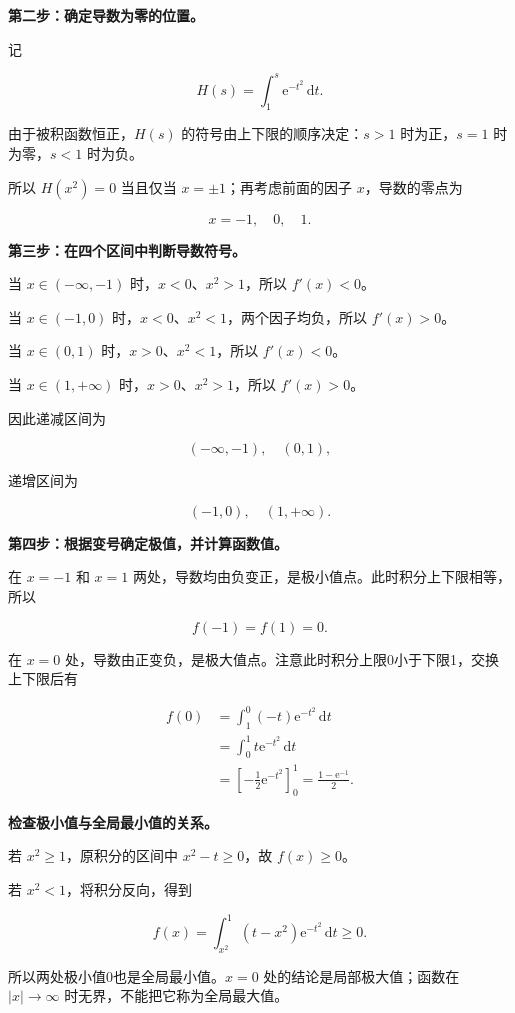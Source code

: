 \documentclass[UTF8,11pt,fontset=windows]{ctexart}
\begin{document}
\textbf{第二步：确定导数为零的位置。}

记

$$
H(s)=\int_1^s\mathrm e^{-t^2}\,\mathrm dt.
$$

由于被积函数恒正，$H(s)$ 的符号由上下限的顺序决定：$s>1$ 时为正，$s=1$ 时为零，$s<1$ 时为负。

所以 $H(x^2)=0$ 当且仅当 $x=\pm1$；再考虑前面的因子 $x$，导数的零点为

$$
x=-1,\quad0,\quad1.
$$

\textbf{第三步：在四个区间中判断导数符号。}

当 $x\in(-\infty,-1)$ 时，$x<0$、$x^2>1$，所以 $f'(x)<0$。

当 $x\in(-1,0)$ 时，$x<0$、$x^2<1$，两个因子均负，所以 $f'(x)>0$。

当 $x\in(0,1)$ 时，$x>0$、$x^2<1$，所以 $f'(x)<0$。

当 $x\in(1,+\infty)$ 时，$x>0$、$x^2>1$，所以 $f'(x)>0$。

因此递减区间为

$$
\boxed{(-\infty,-1),\quad(0,1)},
$$

递增区间为

$$
\boxed{(-1,0),\quad(1,+\infty)}.
$$

\textbf{第四步：根据变号确定极值，并计算函数值。}

在 $x=-1$ 和 $x=1$ 两处，导数均由负变正，是极小值点。此时积分上下限相等，所以

$$
\boxed{f(-1)=f(1)=0}.
$$

在 $x=0$ 处，导数由正变负，是极大值点。注意此时积分上限0小于下限1，交换上下限后有

$$
\begin{aligned}
f(0)
&=\int_1^0(-t)\mathrm e^{-t^2}\,\mathrm dt\\
&=\int_0^1t\mathrm e^{-t^2}\,\mathrm dt\\
&=\left[-\frac12\mathrm e^{-t^2}\right]_0^1
=\boxed{\frac{1-\mathrm e^{-1}}2}.
\end{aligned}
$$

\textbf{检查极小值与全局最小值的关系。}

若 $x^2\ge1$，原积分的区间中 $x^2-t\ge0$，故 $f(x)\ge0$。

若 $x^2<1$，将积分反向，得到

$$
f(x)=\int_{x^2}^1(t-x^2)\mathrm e^{-t^2}\,\mathrm dt\ge0.
$$

所以两处极小值0也是全局最小值。$x=0$ 处的结论是局部极大值；函数在 $|x|\to\infty$ 时无界，不能把它称为全局最大值。
\end{document}
